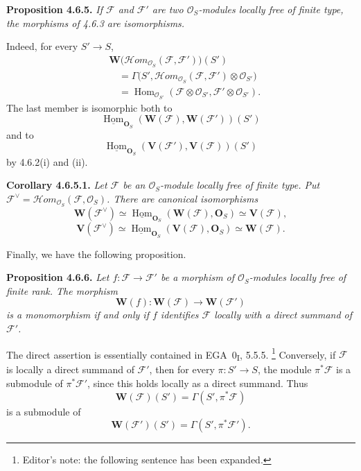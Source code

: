 \medskip
\noindent\textbf{Proposition 4.6.5.}
\textit{If \(\mathscr F\) and \(\mathscr F'\) are two
\(\mathcal O_S\)-modules locally free of finite type, the morphisms of
4.6.3 are isomorphisms.}

Indeed, for every \(S'\to S\),
\begin{align*}
  &\mathbf W
    \bigl(\mathscr{H}om_{\mathcal O_S}(\mathscr F,\mathscr F')\bigr)(S')\\
  &\quad=
    \Gamma\bigl(S',
      \mathscr{H}om_{\mathcal O_S}(\mathscr F,\mathscr F')
        \otimes\mathcal O_{S'}\bigr)\\
  &\quad=
    \operatorname{Hom}_{\mathcal O_{S'}}
      (\mathscr F\otimes\mathcal O_{S'},
       \mathscr F'\otimes\mathcal O_{S'}).
\end{align*}
The last member is isomorphic both to
\[
  \underline{\operatorname{Hom}}_{\mathbf O_S}
    (\mathbf W(\mathscr F),\mathbf W(\mathscr F'))(S')
\]
and to
\[
  \underline{\operatorname{Hom}}_{\mathbf O_S}
    (\mathbf V(\mathscr F'),\mathbf V(\mathscr F))(S')
\]
by 4.6.2(i) and (ii).

\medskip
\noindent\textbf{Corollary 4.6.5.1.}
\textit{Let \(\mathscr F\) be an \(\mathcal O_S\)-module locally free
of finite type. Put
\(\mathscr F^{\vee}
=\mathscr{H}om_{\mathcal O_S}(\mathscr F,\mathcal O_S)\). There are
canonical isomorphisms
\[
  \mathbf W(\mathscr F^{\vee})
    \simeq
  \underline{\operatorname{Hom}}_{\mathbf O_S}
    (\mathbf W(\mathscr F),\mathbf O_S)
    \simeq\mathbf V(\mathscr F),
\]
\[
  \mathbf V(\mathscr F^{\vee})
    \simeq
  \underline{\operatorname{Hom}}_{\mathbf O_S}
    (\mathbf V(\mathscr F),\mathbf O_S)
    \simeq\mathbf W(\mathscr F).
\]}

Finally, we have the following proposition.

\medskip
\noindent\textbf{Proposition 4.6.6.}
\textit{Let \(f:\mathscr F\to\mathscr F'\) be a morphism of
\(\mathcal O_S\)-modules locally free of finite rank. The morphism
\[
  \mathbf W(f):\mathbf W(\mathscr F)\longrightarrow\mathbf W(\mathscr F')
\]
is a monomorphism if and only if \(f\) identifies \(\mathscr F\)
locally with a direct summand of \(\mathscr F'\).}

The direct assertion is essentially contained in EGA~0\textsubscript{I},
5.5.5.
\footnote{Editor's note: the following sentence has been expanded.}
Conversely, if \(\mathscr F\) is locally a direct summand of
\(\mathscr F'\), then for every \(\pi:S'\to S\), the module
\(\pi^*\mathscr F\) is a submodule of \(\pi^*\mathscr F'\), since this
holds locally as a direct summand. Thus
\[
  \mathbf W(\mathscr F)(S')=\Gamma(S',\pi^*\mathscr F)
\]
is a submodule of
\[
  \mathbf W(\mathscr F')(S')=\Gamma(S',\pi^*\mathscr F').
\]

